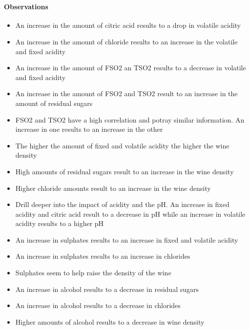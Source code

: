 \documentclass[11pt]{article}
\providecommand{\tightlist}{%
      \setlength{\itemsep}{0pt}\setlength{\parskip}{0pt}}
\begin{document}
    \begin{center}
    \end{center}
    { \hspace*{\fill} \\}
    
    \paragraph{Observations}\label{observations}

\begin{itemize}
\tightlist
\item
  An increase in the amount of citric acid results to a drop in volatile
  acidity
\item
  An increase in the amount of chloride results to an increase in the
  volatile and fixed acidity
\item
  An increase in the amount of FSO2 an TSO2 results to a decrease in
  volatile and fixed acidity
\item
  An increase in the amount of FSO2 and TSO2 result to an increase in
  the amount of residual sugars
\item
  FSO2 and TSO2 have a high correlation and potray similar information.
  An increase in one results to an increase in the other
\item
  The higher the amount of fixed and volatile acidity the higher the
  wine density
\item
  High amounts of residual sugars result to an increase in the wine
  density
\item
  Higher chloride amounts result to an increase in the wine density
\item
  Drill deeper into the impact of acidity and the pH. An increase in
  fixed acidity and citric acid result to a decrease in pH while an
  increase in volatile acidity results to a higher pH
\item
  An increase in sulphates results to an increase in fixed and volatile
  acidity
\item
  An increase in sulphates results to an increase in chlorides
\item
  Sulphates seem to help raise the density of the wine
\item
  An increase in alcohol results to a decrease in residual sugars
\item
  An increase in alcohol results to a decrease in chlorides
\item
  Higher amounts of alcohol results to a decrease in wine density
\end{itemize}
\end{document}
